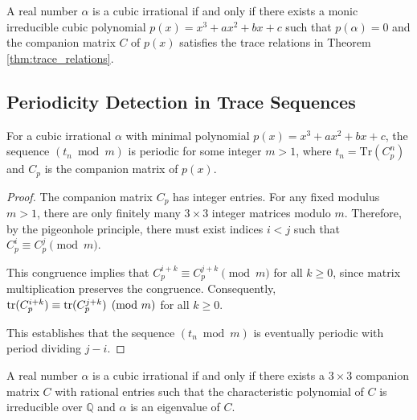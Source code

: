 \begin{corollary}\label{cor:matrix_characterization_trace}
A real number $\alpha$ is a cubic irrational if and only if there exists a monic irreducible cubic polynomial $p(x) = x^3 + ax^2 + bx + c$ such that $p(\alpha) = 0$ and the companion matrix $C$ of $p(x)$ satisfies the trace relations in Theorem \ref{thm:trace_relations}.
\end{corollary}

\subsection{Periodicity Detection in Trace Sequences}

\begin{theorem}\label{thm:trace_periodicity}
For a cubic irrational $\alpha$ with minimal polynomial $p(x) = x^3 + ax^2 + bx + c$, the sequence $(t_n \bmod m)$ is periodic for some integer $m > 1$, where $t_n = \text{Tr}(C_p^n)$ and $C_p$ is the companion matrix of $p(x)$.
\end{theorem}

\begin{proof}
The companion matrix $C_p$ has integer entries. For any fixed modulus $m > 1$, there are only finitely many $3 \times 3$ integer matrices modulo $m$. Therefore, by the pigeonhole principle, there must exist indices $i < j$ such that $C_p^i \equiv C_p^j \pmod{m}$.

This congruence implies that $C_p^{i+k} \equiv C_p^{j+k} \pmod{m}$ for all $k \geq 0$, since matrix multiplication preserves the congruence. Consequently, $\operatorname{tr}(C_p^{i+k}) \equiv \operatorname{tr}(C_p^{j+k}) \pmod{m}$ for all $k \geq 0$.

This establishes that the sequence $(t_n \bmod m)$ is eventually periodic with period dividing $j-i$.
\end{proof}

\begin{theorem}\label{thm:matrix_cubic}
A real number $\alpha$ is a cubic irrational if and only if there exists a $3 \times 3$ companion matrix $C$ with rational entries such that the characteristic polynomial of $C$ is irreducible over $\mathbb{Q}$ and $\alpha$ is an eigenvalue of $C$.
\end{theorem}

